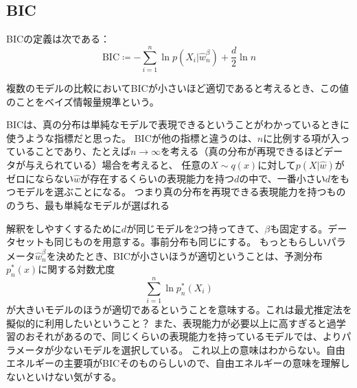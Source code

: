 \documentclass[dvipdfmx]{jsarticle}
\begin{document}
\subsection{BIC}
BICの定義は次である：
\begin{equation}
    \text{BIC} \coloneqq -\sum_{i=1}^{n}\ln{p(X_i|\hat{w}_n^{\beta})} + \frac{d}{2}\ln{n}
\end{equation}

複数のモデルの比較においてBICが小さいほど適切であると考えるとき、この値のことをベイズ情報量規準という。

BICは、真の分布は単純なモデルで表現できるということがわかっているときに使うような指標だと思った。
BICが他の指標と違うのは、$n$に比例する項が入っていることであり、たとえば$n\to\infty$を考える（真の分布が再現できるほどデータが与えられている）場合を考えると、
任意の$X\sim q(x)$に対して$p(X|\hat{w})$がゼロにならない$\hat{w}$が存在するくらいの表現能力を持つ$d$の中で、一番小さい$d$をもつモデルを選ぶことになる。
つまり真の分布を再現できる表現能力を持つもののうち、最も単純なモデルが選ばれる

\begin{mybox}[BICについて定性的に理解する]
    解釈をしやすくするために$d$が同じモデルを2つ持ってきて、$\beta$も固定する。データセットも同じものを用意する。事前分布も同じにする。
    もっともらしいパラメータ$\hat{w}_{n}^{\beta}$を決めたとき、BICが小さいほうが適切ということは、予測分布$p_n^{*}(x)$に関する対数尤度
    \begin{equation}
        \sum_{i=1}^{n}\ln p_n^{*}(X_i)
    \end{equation}
    が大きいモデルのほうが適切であるということを意味する。これは最尤推定法を擬似的に利用したいということ？
    また、表現能力が必要以上に高すぎると過学習のおそれがあるので、同じくらいの表現能力を持っているモデルでは、よりパラメータが少ないモデルを選択している。
    これ以上の意味はわからない。自由エネルギーの主要項がBICそのものらしいので、自由エネルギーの意味を理解しないといけない気がする。
\end{mybox}


\newpage
\end{document}
